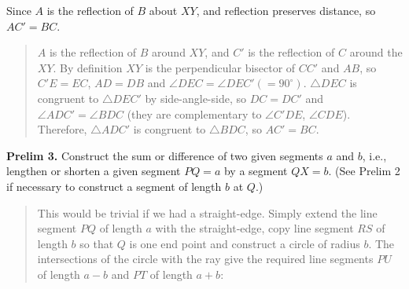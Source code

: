 \documentclass[11pt,a4paper]{article}
\begin{document}
Since $A$ is the reflection of $B$ about $XY$, and reflection preserves distance, so $AC'=BC$.

\begin{quote}
$A$ is the reflection of $B$ around $XY$, and $C'$ is the reflection of $C$ around the $XY$. By definition $XY$ is the perpendicular bisector of $CC'$ and $AB$, so $C'E=EC$, $AD=DB$ and $\angle DEC=\angle DEC'(=90^\circ)$. $\triangle DEC$ is congruent to $\triangle DEC'$ by side-angle-side, so $DC=DC'$ and $\angle ADC'=\angle BDC$ (they are complementary to $\angle C'DE$, $\angle CDE$). Therefore, $\triangle ADC'$ is congruent to $\triangle BDC$, so $AC'=BC$.
\end{quote}


\textbf{Prelim 3.} Construct the sum or difference of two given segments $a$ and $b$, i.e., lengthen or shorten a given segment $PQ = a$ by a segment $QX = b$. (See Prelim 2 if necessary to construct a segment of length $b$ at $Q$.)

\begin{quote}
This would be trivial if we had a straight-edge. Simply extend the line segment $PQ$ of length $a$ with the straight-edge, copy line segment $RS$ of length $b$ so that $Q$ is one end point and construct a circle of radius $b$. The intersections of the circle with the ray give the required line segments $PU$ of length $a-b$ and $PT$ of length $a+b$:
\begin{center}
\vspace*{-2ex}
\end{center}
\vspace*{-4ex}
\end{quote}
\end{document}
